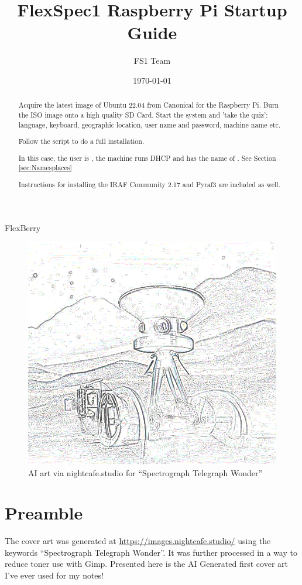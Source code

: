 \documentclass[letter,11pt,oneside]{article}
\newcommand{\dhl}[1]{{\color{verbcolor}{\texttt#1}}}
\begin{document}

\vskip 1.5cm



 {\Huge FlexBerry}


\begin{figure}[h!]
\centering
\includegraphics[width=.65\textwidth]{images/FlexBerry.png}\\
\hskip 4cm {\tiny AI art via nightcafe.studio for ``Spectrograph Telegraph Wonder''}
\end{figure}



\newpage
\section*{Preamble}

The cover art was generated at \url{https://images.nightcafe.studio/}
using the keywords ``Spectrograph Telegraph Wonder''. It was further
processed in a way to reduce toner use with Gimp. Presented here is
the AI Generated first cover art I've ever used for my notes!

\newpage

\title{FlexSpec1 Raspberry Pi Startup Guide}
\author{FS1 Team}
\date{\today}
\maketitle

\begin{abstract}
Acquire the latest image of Ubuntu 22.04 from Canonical for the
Raspberry Pi.  Burn the ISO image onto a high quality SD Card.  Start
the system and 'take the quiz': language, keyboard, geographic
location, user name and password, machine name etc.

Follow the \dhl{FollowMe.sh} script to do a full installation.

In this case, the user is \dhl{fred}, the machine runs DHCP and has
the name of \dhl{pier15}. See Section \ref{sec:Namesplaces}

Instructions for installing the IRAF Community 2.17 and Pyraf3
are included as well.

\end{abstract}
\end{document}

